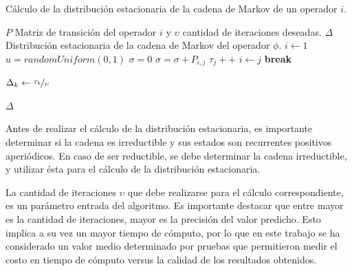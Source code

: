 \begin{algorithm}[!t]
	\caption{C\'alculo de la distribuci\'on estacionaria de la cadena de Markov de un operador $i$.}
	\label{alg:distEstacionaria}
	\begin{algorithmic}[1]
	\REQUIRE $P$ Matriz de transici\'on del operador $i$ y $\upsilon$ cantidad de iteraciones deseadas.
	\ENSURE $\Delta$ Distribuci\'on estacionaria de la cadena de Markov del operador $\phi$.
	\STATE $i \leftarrow 1$
		\STATE $u = randomUniform(0,1)$
		\STATE $\sigma = 0$
			\STATE $\sigma = \sigma + P_{i,j}$
				\STATE $\tau_{j}++$
				\STATE $i \leftarrow j$
				\STATE \textbf{break}
			\ENDIF
		\ENDFOR
	\ENDFOR

		\STATE $\Delta_{k} \leftarrow \nicefrac{\tau_{k}}{\upsilon}$
	\ENDFOR	
	
	\RETURN $\Delta$
	
	\end{algorithmic}
\end{algorithm}


\normalsize{Antes de realizar el c\'alculo de la distribuci\'on estacionaria, es importante determinar si la cadena es irreductible y sus estados son recurrentes positivos aperi\'odicos. En caso de ser reductible, se debe determinar la cadena irreductible, y utilizar \'esta para el c\'alculo de la distribuci\'on estacionaria.}

La cantidad de iteraciones $\upsilon$ que debe realizarse para el c\'alculo correspondiente, es un par\'ametro entrada del algoritmo. Es importante destacar que entre mayor es la cantidad de iteraciones, mayor es la precisi\'on del valor predicho. Esto implica a su vez un mayor tiempo de c\'omputo, por lo que en este trabajo se ha considerado un valor medio determinado por pruebas que permitieron medir el costo en tiempo de c\'omputo versus la calidad de los resultados obtenidos.

